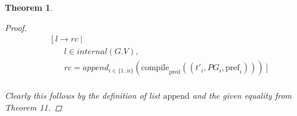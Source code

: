 \documentclass[twocolumn, openany]{sig-alternate-10pt}
\newcommand{\CompilePred}{\ensuremath{\mathrm{compile}_\mathrm{pred}}}
\newcommand{\Pref}{\ensuremath{\mathrm{pref}}}
\newtheorem{thm}{Theorem}
\begin{document}
\begin{thm}
\begin{proof}
    \[ \begin{array}{l}
     ~~~~~ [~ l \rightarrow rc ~\vert~ \\
     ~~~~~~~~~~~~ l \in internal(G.V), \\ 
     ~~~~~~~~~~~~ rc = append_{i \in \{1..n\}}(\CompilePred((t'_i, PG_i, \Pref_i))) ~] \\
    \end{array} \]%

    \noindent
    Clearly this follows by the definition of list $\mathrm{append}$ and the given equality from Theorem 11.

  \end{proof}

\end{thm}
\end{document}
